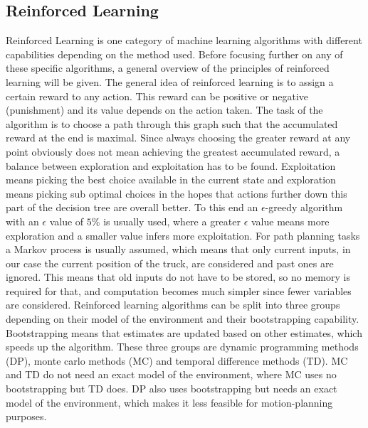\subsection{Reinforced Learning}
\label{sec:reinforced_learning}

Reinforced Learning is one category of machine learning algorithms with different capabilities depending on the method used. Before focusing further on any of these specific algorithms, a general overview of the principles of reinforced learning will be given. The general idea of reinforced learning is to assign a certain reward to any action. This reward can be positive or negative (punishment) and its value depends on the action taken. The task of the algorithm is to choose a path through this graph such that the accumulated reward at the end is maximal. Since always choosing the greater reward at any point obviously does not mean achieving the greatest accumulated reward, a balance between exploration and exploitation has to be found. Exploitation means picking the best choice available in the current state and exploration means picking sub optimal choices in the hopes that actions further down this part of the decision tree are overall better. To this end an $\epsilon$-greedy algorithm with an $\epsilon$ value of $5\%$ is usually used, where a greater $\epsilon$ value means more exploration and a smaller value infers more exploitation. For path planning tasks a Markov process is usually assumed, which means that only current inputs, in our case the current position of the truck, are considered and past ones are ignored. This means that old inputs do not have to be stored, so no memory is required for that, and computation becomes much simpler since fewer variables are considered. Reinforced learning algorithms can be split into three groups depending on their model of the environment and their bootstrapping capability. Bootstrapping means that estimates are updated based on other estimates, which speeds up the algorithm. These three groups are dynamic programming methods (DP), monte carlo methods (MC) and temporal difference methods (TD). MC and TD do not need an exact model of the environment, where MC uses no bootstrapping but TD does. DP also uses bootstrapping but needs an exact model of the environment, which makes it less feasible for motion-planning purposes.\\
